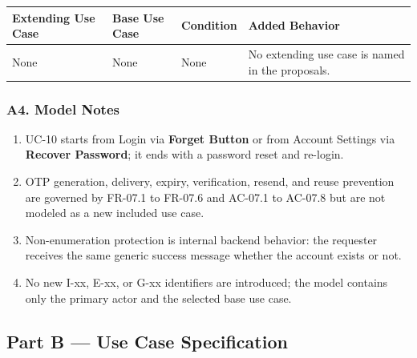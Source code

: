 \documentclass[12pt]{article}
\renewcommand{\baselinestretch}{1.5}
\begin{document}
\begingroup
\small
\renewcommand{\baselinestretch}{1.0}\selectfont
\renewcommand{\arraystretch}{1.15}
\setlength{\tabcolsep}{6pt}
\begin{longtable}{|>{\raggedright\arraybackslash}p{}|>{\raggedright\arraybackslash}p{}|>{\raggedright\arraybackslash}p{}|>{\raggedright\arraybackslash}p{}|}
\hline
\textbf{Extending Use Case} & \textbf{Base Use Case} & \textbf{Condition} & \textbf{Added Behavior} \\ \hline
\endhead
None & None & None & No extending use case is named in the proposals. \\ \hline
\end{longtable}
\endgroup
\par\medskip

\hypertarget{sec:a4-model-notes}{}
\subsubsection*{A4. Model Notes}
\par\medskip

\begin{enumerate}
\item UC-10 starts from Login via \textbf{Forget Button} or from Account Settings via \textbf{Recover Password}; it ends with a password reset and re-login.
\item OTP generation, delivery, expiry, verification, resend, and reuse prevention are governed by FR-07.1 to FR-07.6 and AC-07.1 to AC-07.8 but are not modeled as a new included use case.
\item Non-enumeration protection is internal backend behavior: the requester receives the same generic success message whether the account exists or not.
\item No new I-xx, E-xx, or G-xx identifiers are introduced; the model contains only the primary actor and the selected base use case.
\end{enumerate}
\par\medskip

\hypertarget{sec:part-b-use-case-specification}{}
\subsection*{Part B --- Use Case Specification}
\par\medskip
\end{document}
